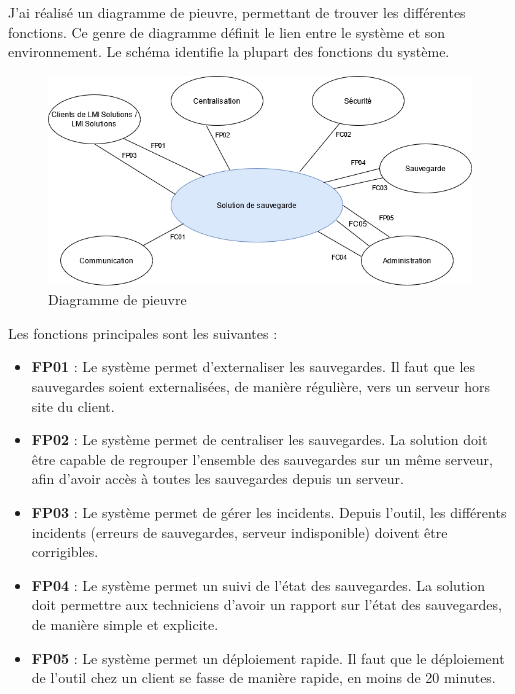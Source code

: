 \documentclass[pfe]{tnreport} %
\begin{document}
J'ai réalisé un diagramme de pieuvre, permettant de trouver les différentes fonctions. \newline
Ce genre de diagramme définit le lien entre le système et son environnement. Le schéma identifie la plupart des fonctions du système.

\begin{figure}[ht]
 \centering
 \includegraphics[width=15cm]{figures/peiuvre.png}
 \caption{Diagramme de pieuvre}
 \label{fig:pieuvre}
\end{figure}
Les fonctions principales sont les suivantes : \newline
\begin{itemize}
    \item \textbf{FP01} : Le système permet d'externaliser les sauvegardes. \newline
Il faut que les sauvegardes soient externalisées, de manière régulière, vers un serveur hors site du client.\newline
\item \textbf{FP02} : Le système permet de centraliser les sauvegardes. \newline
La solution doit être capable de regrouper l'ensemble des sauvegardes sur un même serveur, afin d'avoir accès à toutes les sauvegardes depuis un serveur. \newline
\item \textbf{FP03} : Le système permet de gérer les incidents. \newline
Depuis l'outil, les différents incidents (erreurs de sauvegardes, serveur indisponible) doivent être corrigibles. \newline
\item \textbf{FP04} : Le système permet un suivi de l'état des sauvegardes. \newline
La solution doit permettre aux techniciens d'avoir un rapport sur l'état des sauvegardes, de manière simple et explicite. \newline
\item \textbf{FP05} : Le système permet un déploiement rapide. \newline
Il faut que le déploiement de l'outil chez un client se fasse de manière rapide, en moins de 20 minutes. \newline
\end{itemize}
\end{document}
